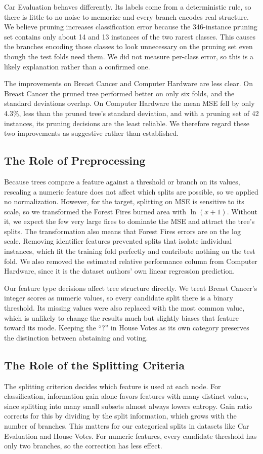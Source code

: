 \documentclass[twoside,11pt]{article}
\begin{document}
Car Evaluation behaves differently. Its labels come from a deterministic rule, so there is little to no noise to memorize and every branch encodes real structure. We believe pruning increases classification error because the 346-instance pruning set contains only about 14 and 13 instances of the two rarest classes. This causes the branches encoding those classes to look unnecessary on the pruning set even though the test folds need them. We did not measure per-class error, so this is a likely explanation rather than a confirmed one.

The improvements on Breast Cancer and Computer Hardware are less clear. On Breast Cancer the pruned tree performed better on only six folds, and the standard deviations overlap. On Computer Hardware the mean MSE fell by only 4.3\%, less than the pruned tree's standard deviation, and with a pruning set of 42 instances, its pruning decisions are the least reliable. We therefore regard these two improvements as suggestive rather than established.

\subsection{The Role of Preprocessing}
Because trees compare a feature against a threshold or branch on its values, rescaling a numeric feature does not affect which splits are possible, so we applied no normalization. However, for the target, splitting on MSE is sensitive to its scale, so we transformed the Forest Fires burned area with $\ln(x+1)$. Without it, we expect the few very large fires to dominate the MSE and attract the tree's splits. The transformation also means that Forest Fires errors are on the log scale. Removing identifier features prevented splits that isolate individual instances, which fit the training fold perfectly and contribute nothing on the test fold. We also removed the estimated relative performance column from Computer Hardware, since it is the dataset authors' own linear regression prediction.

Our feature type decisions affect tree structure directly. We treat Breast Cancer's integer scores as numeric values, so every candidate split there is a binary threshold. Its missing values were also replaced with the most common value, which is unlikely to change the results much but slightly biases that feature toward its mode. Keeping the ``?'' in House Votes as its own category preserves the distinction between abstaining and voting.

\subsection{The Role of the Splitting Criteria}
The splitting criterion decides which feature is used at each node. For classification, information gain alone favors features with many distinct values, since splitting into many small subsets almost always lowers entropy. Gain ratio corrects for this by dividing by the split information, which grows with the number of branches. This matters for our categorical splits in datasets like Car Evaluation and House Votes. For numeric features, every candidate threshold has only two branches, so the correction has less effect.
\end{document}
